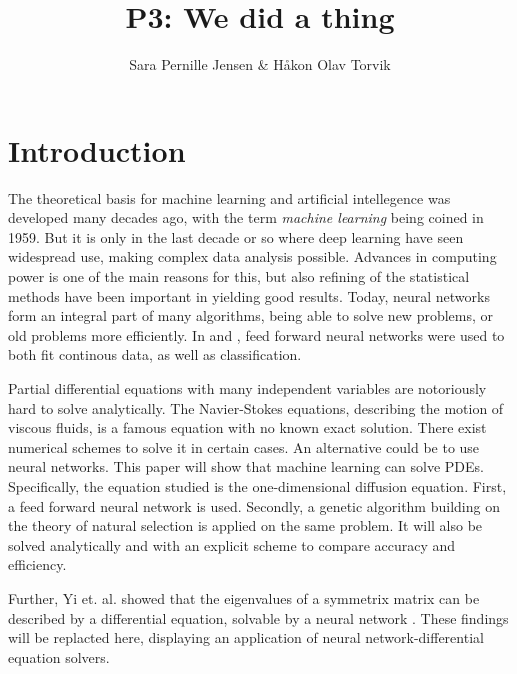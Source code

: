 \documentclass[multicolumn, 10pt]{extarticle}
\author{\Large Sara Pernille Jensen \& Håkon Olav Torvik}
\title{\Huge P3: We did a thing}
\affiliation{\large FYS-STK4155 – Applied Data Analysis and Machine Learning
\\Autumn 2021\\Department of Physics\\University of Oslo\\\\\today}
\begin{document}



\maketitle

\pagestyle{myplain}


\twocolumn
\section{Introduction}

The theoretical basis for machine learning and artificial intellegence was developed many decades ago, with the term \textit{machine learning} being coined in 1959. But it is only in the last decade or so where deep learning have seen widespread use, making complex data analysis possible. Advances in computing power is one of the main reasons for this, but also refining of the statistical methods have been important in yielding good results. Today, neural networks form an integral part of many algorithms, being able to solve new problems, or old problems more efficiently. In \cite{p2S} and \cite{p2HO}, feed forward neural networks were used to both fit continous data, as well as classification.

Partial differential equations with many independent variables are notoriously hard to solve analytically. The Navier-Stokes equations, describing the motion of viscous fluids, is a famous equation with no known exact solution. There exist numerical schemes to solve it in certain cases. An alternative could be to use neural networks. This paper will show that machine learning can solve PDEs. Specifically, the equation studied is the one-dimensional diffusion equation. First, a feed forward neural network is used. Secondly, a genetic algorithm building on the theory of natural selection is applied on the same problem. It will also be solved analytically and with an explicit scheme to compare accuracy and efficiency.

Further, Yi et. al. showed that the eigenvalues of a symmetrix matrix can be described by a differential equation, solvable by a neural network \cite{symmetric}. These findings will be replacted here, displaying an application of neural network-differential equation solvers.
\end{document}
